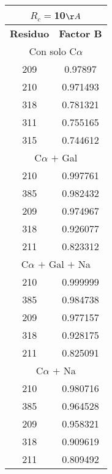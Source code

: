 \begin{tabular}[c]{|c|c|}
\multicolumn{2}{c}{$R_c=$10$\AA$}\\\hline
\textbf{Residuo}&\textbf{Factor B}\\\hline
\multicolumn{2}{c}{Con solo C$\alpha$}\\\hline
       209&   0.97897\\
       210&  0.971493\\
       318&  0.781321\\
       311&  0.755165\\
       315&  0.744612\\
\hline
\multicolumn{2}{c}{C$\alpha$ $+$ Gal}\\\hline
       210&  0.997761\\
       385&  0.982432\\
       209&  0.974967\\
       318&  0.926077\\
       211&  0.823312\\
\hline
\multicolumn{2}{c}{C$\alpha$ $+$ Gal $+$ Na}\\\hline
       210&  0.999999\\
       385&  0.984738\\
       209&  0.977157\\
       318&  0.928175\\
       211&  0.825091\\
\hline
\multicolumn{2}{c}{C$\alpha$ $+$ Na}\\\hline
       210&  0.980716\\
       385&  0.964528\\
       209&  0.958321\\
       318&  0.909619\\
       211&  0.809492\\
\hline
\end{tabular}
